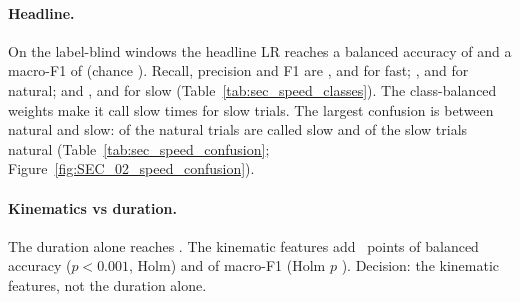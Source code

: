\paragraph{Headline.} On the label-blind windows the headline LR reaches a balanced accuracy of
 and a macro-F1 of  (chance ).
Recall, precision and F1 are ,  and
 for fast; ,
 and  for natural; and
,  and  for slow
(Table~\ref{tab:sec_speed_classes}). The class-balanced weights make it call slow
 times for  slow trials. The largest confusion is
between natural and slow:  of the natural trials are called slow and
 of the slow trials natural (Table~\ref{tab:sec_speed_confusion};
Figure~\ref{fig:SEC_02_speed_confusion}).

\paragraph{Kinematics vs duration.} The duration alone reaches . The kinematic
features add ~points of balanced accuracy ($p < 0.001$,
Holm) and  of macro-F1 (Holm $p$
). Decision: the kinematic features, not the duration
alone.

